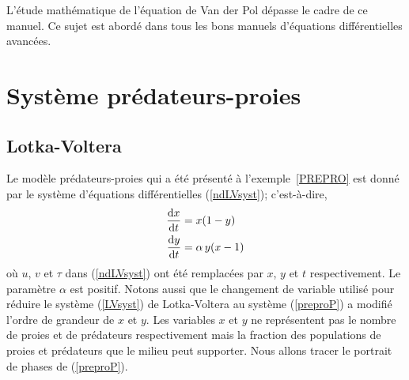 {\begin{egg}

L'étude mathématique de l'équation de Van der Pol dépasse le cadre de
ce manuel.  Ce sujet est abordé dans tous les bons manuels
d'équations différentielles avancées.
\end{egg}

\section{Système prédateurs-proies}

\subsection{Lotka-Voltera}

Le modèle prédateurs-proies qui a été présenté à l'exemple~\ref{PREPRO} 
est donné par le système d'équations différentielles (\ref{ndLVsyst});
c'est-à-dire,
\begin{equation} \label{preproP}
\begin{split}
\frac{\mathrm{d}x}{\mathrm{d}t} &= x(1-y) \\
\frac{\mathrm{d}y}{\mathrm{d}t} &= \alpha \,y(x - 1)
\end{split}
\end{equation}
où $u$, $v$ et $\tau$ dans (\ref{ndLVsyst}) ont été remplacées par $x$, $y$
et $t$ respectivement.  Le paramètre $\alpha$ est positif.
Notons aussi que le changement de variable utilisé pour réduire
le système (\ref{LVsyst}) de Lotka-Voltera au système
(\ref{preproP}) a modifié l'ordre de grandeur de $x$ et
$y$.  Les variables $x$ et $y$ ne représentent pas le nombre de proies
et de prédateurs respectivement mais la fraction des populations de
proies et prédateurs que le milieu peut supporter.
Nous allons tracer le portrait de phases de (\ref{preproP}).

}
